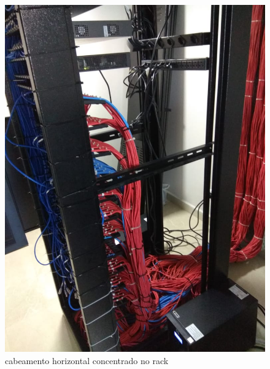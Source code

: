\documentclass[	DIV=calc,%
							paper=a4,%
							fontsize=12pt,%
							onecolumn]{scrartcl}	 					%
\begin{document}
\begin{figure}
	\centering
	\includegraphics[width=\textwidth]{fig4}
	\caption{cabeamento horizontal concentrado no rack}
	\label{leg}
\end{figure}
\end{document}

